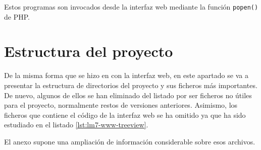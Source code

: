 Estos programas son invocados desde la interfaz web mediante la función \verb|popen()| de PHP.

\section{Estructura del proyecto}

De la misma forma que se hizo en con la interfaz web, en este apartado se va a presentar la estructura de directorios del proyecto y sus ficheros más importantes. De nuevo, algunos de ellos se han eliminado del listado por ser ficheros no útiles para el proyecto, normalmente restos de versiones anteriores. Asimismo, los ficheros que contiene el código de la interfaz web se ha omitido ya que ha sido estudiado en el listado \ref{lst:lm7-www-treeview}.

El anexo  supone una ampliación de información considerable sobre esos archivos. \\

